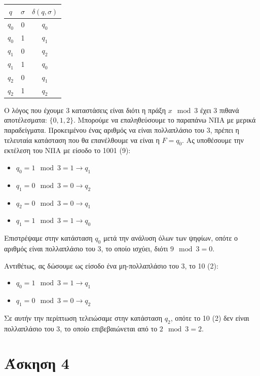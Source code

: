 \documentclass[12pt]{article}
\begin{document}
\begin{center}
\begin{tabular}{ccc}
	$q$ & $σ$ & $δ(q, σ)$ \\
	\hline
	$q_0$ & 0 & $q_0$ \\
	$q_0$ & 1 & $q_1$ \\
	$q_1$ & 0 & $q_2$ \\
	$q_1$ & 1 & $q_0$ \\
	$q_2$ & 0 & $q_1$ \\
	$q_2$ & 1 & $q_2$ \\
\end{tabular}
\end{center}

Ο λόγος που έχουμε 3 καταστάσεις είναι διότι η πράξη $x \mod 3$ έχει 3 πιθανά
αποτέλεσματα: $\{0, 1, 2\}$. Μπορούμε να επαληθεύσουμε το παραπάνω ΝΠΑ με
μερικά παραδείγματα. Προκειμένου ένας αριθμός να είναι πολλαπλάσιο του 3,
πρέπει η τελευταία κατάσταση που θα επανέλθουμε να είναι η $F= q_0$. Ας
υποθέσουμε την εκτέλεση του ΝΠΑ με είσοδο το 1001 (9):

\begin{itemize}
	\item $q_0 = 1 \mod 3 = 1 \rightarrow q_1$
	\item $q_1 = 0 \mod 3 = 0 \rightarrow q_2$
	\item $q_2 = 0 \mod 3 = 0 \rightarrow q_1$
	\item $q_1 = 1 \mod 3 = 1 \rightarrow q_0$
\end{itemize}

Επιστρέψαμε στην κατάσταση $q_0$ μετά την ανάλυση όλων των ψηφίων, οπότε ο
αριθμός είναι πολλαπλάσιο του 3, το οποίο ισχύει, διότι $9 \mod 3 = 0$.

Αντιθέτως, ας δώσουμε ως είσοδο ένα μη-πολλαπλάσιο του 3, το 10 (2):

\begin{itemize}
	\item $q_0 = 1 \mod 3 = 1 \rightarrow q_1$
	\item $q_1 = 0 \mod 3 = 0 \rightarrow q_2$
\end{itemize}

Σε αυτήν την περίπτωση τελειώσαμε στην κατάσταση $q_2$, οπότε το 10 (2) δεν
είναι πολλαπλάσιο του 3, το οποίο επιβεβαιώνεται από το $2 \mod 3 = 2$.

\section{Άσκηση 4}
\end{document}
